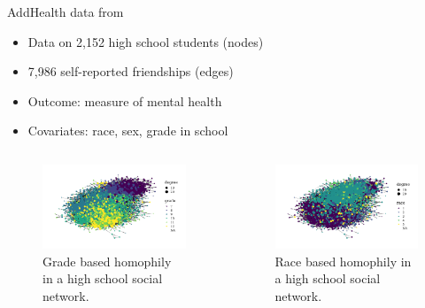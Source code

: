 \documentclass{beamer}
\theoremstyle{remark}
\begin{document}
\begin{frame}{AddHealth data from \cite{le_linear_2021}}

    \begin{itemize}
        \item Data on 2,152 high school students (nodes)
        \item 7,986 self-reported friendships (edges)
        \item Outcome: measure of mental health
        \item Covariates: race, sex, grade in school
    \end{itemize}

    \begin{columns}

        \begin{figure}
            \includegraphics[width=\textwidth]{figures/presentation/homophily-grade.png}
            \caption{Grade based homophily in a high school social network.}
            \label{fig:homophily-grade}
        \end{figure}


        \begin{figure}
            \includegraphics[width=\textwidth]{figures/presentation/homophily-race.png}
            \caption{Race based homophily in a high school social network.}
            \label{fig:homophily-race}
        \end{figure}

    \end{columns}
\end{frame}
\end{document}
